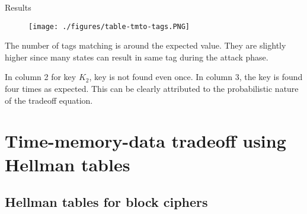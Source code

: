 \documentclass{beamer}
\begin{document}
\begin{frame}{Results}

	\begin{figure}[htp]
	\centering
	\texttt{[image: ./figures/table-tmto-tags.PNG]}
	\end{figure}
\begin{itemize}
\scriptsize{
	\item The number of tags matching is around the expected value. They are slightly higher since many states can result in same tag during the attack phase.
	\item In column 2 for key $K_2$, key is not found even once. In column 3, the key is found four times as expected. This can be clearly attributed to the probabilistic nature of the tradeoff equation.
}
\end{itemize}
\end{frame}


\section{Time-memory-data tradeoff using Hellman tables}

\subsection{Hellman tables for block ciphers}
\end{document}
